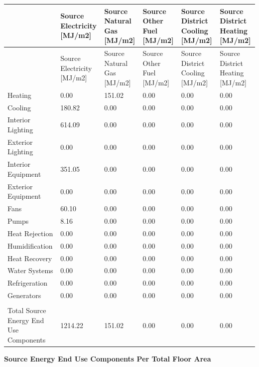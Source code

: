 {\scriptsize
\begin{longtable}[c]{>{\raggedright}p{1.0in}>{\raggedright}p{1.0in}>{\raggedright}p{1.0in}>{\raggedright}p{1.0in}>{\raggedright}p{1.0in}>{\raggedright}p{1.0in}}
\toprule
 & Source Electricity [MJ/m2] & Source Natural Gas [MJ/m2] & Source Other Fuel [MJ/m2] & Source District Cooling [MJ/m2] & Source District Heating [MJ/m2] \tabularnewline
\midrule
\endfirsthead

\toprule
 & Source Electricity [MJ/m2] & Source Natural Gas [MJ/m2] & Source Other Fuel [MJ/m2] & Source District Cooling [MJ/m2] & Source District Heating [MJ/m2] \tabularnewline
\midrule
\endhead

Heating & 0.00 & 151.02 & 0.00 & 0.00 & 0.00 \tabularnewline
Cooling & 180.82 & 0.00 & 0.00 & 0.00 & 0.00 \tabularnewline
Interior Lighting & 614.09 & 0.00 & 0.00 & 0.00 & 0.00 \tabularnewline
Exterior Lighting & 0.00 & 0.00 & 0.00 & 0.00 & 0.00 \tabularnewline
Interior Equipment & 351.05 & 0.00 & 0.00 & 0.00 & 0.00 \tabularnewline
Exterior Equipment & 0.00 & 0.00 & 0.00 & 0.00 & 0.00 \tabularnewline
Fans & 60.10 & 0.00 & 0.00 & 0.00 & 0.00 \tabularnewline
Pumps & 8.16 & 0.00 & 0.00 & 0.00 & 0.00 \tabularnewline
Heat Rejection & 0.00 & 0.00 & 0.00 & 0.00 & 0.00 \tabularnewline
Humidification & 0.00 & 0.00 & 0.00 & 0.00 & 0.00 \tabularnewline
Heat Recovery & 0.00 & 0.00 & 0.00 & 0.00 & 0.00 \tabularnewline
Water Systems & 0.00 & 0.00 & 0.00 & 0.00 & 0.00 \tabularnewline
Refrigeration & 0.00 & 0.00 & 0.00 & 0.00 & 0.00 \tabularnewline
Generators & 0.00 & 0.00 & 0.00 & 0.00 & 0.00 \tabularnewline
 &  &  &  &  &  \tabularnewline
Total Source Energy End Use Components & 1214.22 & 151.02 & 0.00 & 0.00 & 0.00 \tabularnewline
\bottomrule
\end{longtable}}

\textbf{Source Energy End Use Components Per Total Floor Area}

